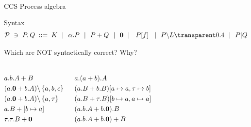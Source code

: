 \documentclass[aspectratio=169]{beamer}
\begin{document}
\begin{slide}{CCS Process algebra}
\small

\begin{block}{Syntax}
\begin{equation*}
\mathcal{P} ~\ni~ P,Q\; ::=\; K ~~|~~ \alpha.P ~~|~~ P + Q ~~|~~ \cnil
        ~~|~~ \crn P f  ~~|~~ P\backslash L \faded{~~|~~ P|Q}
\end{equation*}
\end{block}

\begin{exampleblock}{\exercise Which are NOT syntactically correct? Why?}
\begin{columns}
  \begin{align}
    & a.b.A+B\\&
    (a.\cnil + b.A) \backslash \set{a,b,c}\\&
    (a.\cnil + b.A) \backslash \set{a,\tau}\\& %
    a.B+[b\mapsto a]\\& %
    \tau.\tau.B + \cnil
  \end{align}

  \begin{align} &
    a.(a + b).A\\&
    (a.B + b.B)[a\mapsto a,\tau\mapsto b]\\&
    (a.B + \tau.B)[b\mapsto a,a\mapsto a]\\& %
    (a.b.A + b.\cnil).B\\&
    (a.b.A + b.\cnil)+B
  \end{align}
\end{columns}
\end{exampleblock}

\end{slide}


\exerciseBack


\newcommand{\goOn}[1]{\href{http://lmf.di.uminho.pt/ccs-caos/?#1}{#1}\xspace}
\newcommand{\goOnline}[2]{\href{http://lmf.di.uminho.pt/ccs-caos/?#2}{#1}\xspace}
\end{document}
